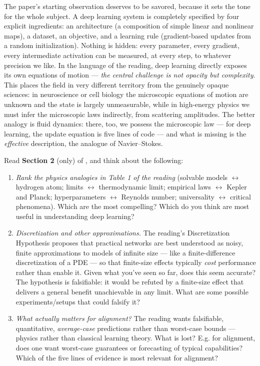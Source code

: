 \documentclass[11pt]{article}
\begin{document}
The paper's starting observation deserves to be savored, because it sets the tone for the whole subject. A deep learning system is completely specified by four explicit ingredients: an architecture (a composition of simple linear and nonlinear maps), a dataset, an objective, and a learning rule (gradient-based updates from a random initialization). Nothing is hidden: every parameter, every gradient, every intermediate activation can be measured, at every step, to whatever precision we like. In the language of the reading, deep learning directly exposes its own equations of motion --- \emph{the central challenge is not opacity but complexity}. This places the field in very different territory from the genuinely opaque sciences: in neuroscience or cell biology the microscopic equations of motion are unknown and the state is largely unmeasurable, while in high-energy physics we must infer the microscopic laws indirectly, from scattering amplitudes. The better analogy is fluid dynamics: there, too, we possess the microscopic law --- for deep learning, the update equation is five lines of code --- and what is missing is the \emph{effective} description, the analogue of Navier--Stokes.

Read \textbf{Section 2} (only) of \cite{simon2026scientific}, and think about the following:

\begin{enumerate}
  \item \emph{Rank the physics analogies in Table 1 of the reading}
  (solvable models $\leftrightarrow$ hydrogen atom; limits
  $\leftrightarrow$ thermodynamic limit; empirical laws $\leftrightarrow$
  Kepler and Planck; hyperparameters $\leftrightarrow$ Reynolds number;
  universality $\leftrightarrow$ critical phenomena). Which are the most compelling? Which do you think are most useful in understanding deep learning?
  
  \item \emph{Discretization and other approximations.} The reading's
  Discretization Hypothesis proposes that practical networks are best
  understood as noisy, finite approximations to models of infinite size --- like a finite-difference discretization of a PDE --- so that finite-size
  effects typically \emph{cost} performance rather than enable it. Given what you've seen so far, does this seem accurate? The hypothesis is falsifiable: it would be refuted by a finite-size effect that delivers a general benefit unachievable in any limit. What are some possible experiments/setups that could falsify it?
  
  \item \emph{What actually matters for alignment?} The reading wants falsifiable, quantitative, \emph{average-case}
  predictions rather than worst-case bounds --- physics rather than
  classical learning theory. What is lost? E.g. for alignment, does one want worst-case guarantees or forecasting of typical capabilities?
  Which of the five lines of evidence is most relevant for alignment?
\end{enumerate}
\end{document}
